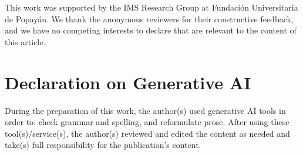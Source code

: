 \documentclass[]{ceurart}
\begin{document}
\begin{acknowledgments}
This work was supported by the IMS Research Group at Fundación Universitaria de
Popayán. We thank the anonymous reviewers for their constructive feedback, and
we have no competing interests to declare that are relevant to the content of
this article.
\end{acknowledgments}

\section*{Declaration on Generative AI}
During the preparation of this work, the author(s) used generative AI tools in
order to: check grammar and spelling, and reformulate prose. After using these
tool(s)/service(s), the author(s) reviewed and edited the content as needed and
take(s) full responsibility for the publication's content.


\end{document}
